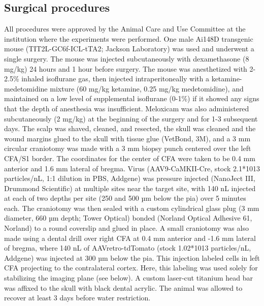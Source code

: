\documentclass{article}
\begin{document}
\subsection{Surgical procedures}
All procedures were approved by the Animal Care and Use Committee at the institution where the experiments were performed. One male Ai148D transgenic mouse (TIT2L-GC6f-ICL-tTA2; Jackson Laboratory) was used and underwent a single surgery. The mouse was injected subcutaneously with dexamethasone (8 mg/kg) 24 hours and 1 hour before surgery. The mouse was anesthetized with 2-2.5\% inhaled isoflurane gas, then injected intraperitoneally with a ketamine-medetomidine mixture (60 mg/kg ketamine, 0.25 mg/kg medetomidine), and maintained on a low level of supplemental isoflurane (0-1\%) if it showed any signs that the depth of anesthesia was insufficient. Meloxicam was also administered subcutaneously (2 mg/kg) at the beginning of the surgery and for 1-3 subsequent days. The scalp was shaved, cleaned, and resected, the skull was cleaned and the wound margins glued to the skull with tissue glue (VetBond, 3M), and a 3 mm circular craniotomy was made with a 3 mm biopsy punch centered over the left CFA/S1 border. The coordinates for the center of CFA were taken to be 0.4 mm anterior and 1.6 mm lateral of bregma. Virus (AAV9-CaMKII-Cre, stock 2.1*1013 particles/nL, 1:1 dilution in PBS, Addgene) was pressure injected (NanoJect III, Drummond Scientific) at multiple sites near the target site, with 140 nL injected at each of two depths per site (250 and 500 µm below the pia) over 5 minutes each. The craniotomy was then sealed with a custom cylindrical glass plug (3 mm diameter, 660 µm depth; Tower Optical) bonded (Norland Optical Adhesive 61, Norland) to a round coverslip and glued in place. A small craniotomy was also made using a dental drill over right CFA at 0.4 mm anterior and -1.6 mm lateral of bregma, where 140 nL of AAVretro-tdTomato (stock 1.02*1013 particles/nL, Addgene) was injected at 300 µm below the pia. This injection labeled cells in left CFA projecting to the contralateral cortex. Here, this labeling was used solely for stabilizing the imaging plane (see below). A custom laser-cut titanium head bar was affixed to the skull with black dental acrylic. The animal was allowed to recover at least 3 days before water restriction.
\end{document}

